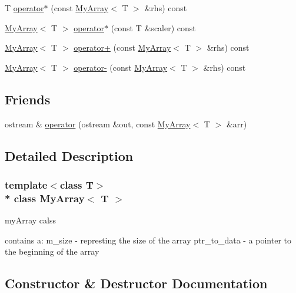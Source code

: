\begin{DoxyCompactItemize}
\item 
T \hyperlink{classMyArray_a491463a1b65467564e572c005bdc38df}{operator$\ast$} (const \hyperlink{classMyArray}{My\+Array}$<$ T $>$ \&rhs) const 
\item 
\hyperlink{classMyArray}{My\+Array}$<$ T $>$ \hyperlink{classMyArray_a65f0252bd35555144a102fe5c4e30629}{operator$\ast$} (const T \&scaler) const 
\item 
\hyperlink{classMyArray}{My\+Array}$<$ T $>$ \hyperlink{classMyArray_ae409f4dbb669a3993c7ea2099ca9076a}{operator+} (const \hyperlink{classMyArray}{My\+Array}$<$ T $>$ \&rhs) const 
\item 
\hyperlink{classMyArray}{My\+Array}$<$ T $>$ \hyperlink{classMyArray_a681601413d5b03d3319959186537430c}{operator-\/} (const \hyperlink{classMyArray}{My\+Array}$<$ T $>$ \&rhs) const 
\end{DoxyCompactItemize}
\subsection*{Friends}
\begin{DoxyCompactItemize}
\item 
ostream \& \hyperlink{classMyArray_a8568f8eed1d6c6b506aed173e9cb9326}{operator} (ostream \&out, const \hyperlink{classMyArray}{My\+Array}$<$ T $>$ \&arr)
\end{DoxyCompactItemize}


\subsection{Detailed Description}
\subsubsection*{template$<$class T$>$\\*
class My\+Array$<$ T $>$}

my\+Array calss

contains a\+: m\+\_\+size -\/ represting the size of the array ptr\+\_\+to\+\_\+data -\/ a pointer to the beginning of the array 

\subsection{Constructor \& Destructor Documentation}
